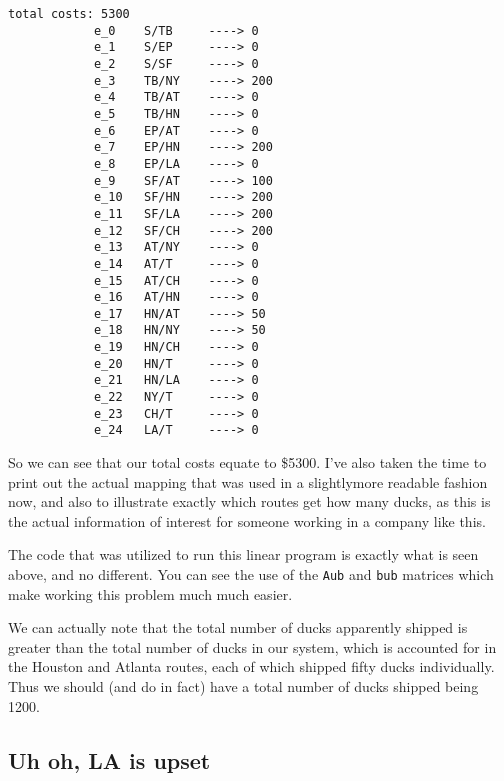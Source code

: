 \documentclass[11pt]{article}
\begin{document}
    \begin{minipage}[t]{0.5\linewidth}
        \begin{lstlisting}[gobble=8]
            total costs: 5300
            e_0	   S/TB     ----> 0
            e_1	   S/EP     ----> 0
            e_2	   S/SF     ----> 0
            e_3	   TB/NY    ----> 200
            e_4	   TB/AT    ----> 0
            e_5	   TB/HN    ----> 0
            e_6	   EP/AT    ----> 0
            e_7	   EP/HN    ----> 200
            e_8	   EP/LA    ----> 0
            e_9	   SF/AT    ----> 100
            e_10   SF/HN    ----> 200
            e_11   SF/LA    ----> 200
            e_12   SF/CH    ----> 200
            e_13   AT/NY    ----> 0
            e_14   AT/T     ----> 0
            e_15   AT/CH    ----> 0
            e_16   AT/HN    ----> 0
            e_17   HN/AT    ----> 50
            e_18   HN/NY    ----> 50
            e_19   HN/CH    ----> 0
            e_20   HN/T     ----> 0
            e_21   HN/LA    ----> 0
            e_22   NY/T     ----> 0
            e_23   CH/T     ----> 0
            e_24   LA/T     ----> 0
        \end{lstlisting}
    \end{minipage}%
    \begin{minipage}[t]{0.5\linewidth}
        \medskip
        So we can see that our total costs equate to \$5300. I've also taken
        the time to print out the actual mapping that was used in a
        slightlymore readable fashion now, and also to illustrate exactly which
        routes get how many ducks, as this is the actual information of
        interest for someone working in a company like this.

        \medskip

        The code that was utilized to run this linear program is exactly what
        is seen above, and no different. You can see the use of the
        \texttt{Aub} and \texttt{bub} matrices which make working this problem
        much much easier.

        \medskip

        We can actually note that the total number of ducks apparently shipped
        is greater than the total number of ducks in our system, which is
        accounted for in the Houston and Atlanta routes, each of which shipped
        fifty ducks individually. Thus we should (and do in fact) have a total
        number of ducks shipped being 1200.
    \end{minipage}

    \subsection{Uh oh, LA is upset}
\end{document}
